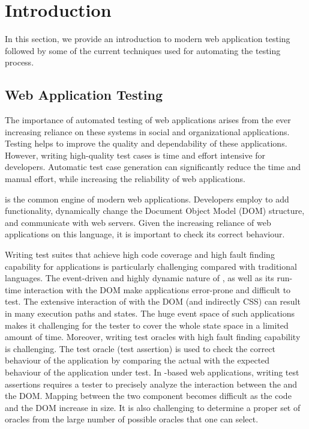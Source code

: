 \chapter{Introduction} \label{chap:intro}
In this section, we provide an introduction to modern web application testing followed by some of the current techniques used for automating the testing process.

\section{Web Application Testing} \label{Sec:web-testing}
The importance of automated testing of web applications arises from the ever increasing
reliance on these systems in social and organizational
applications. Testing helps to improve the quality and dependability of these applications. However, writing high-quality test cases is time and effort intensive for developers.
Automatic test case generation can significantly reduce the time and manual effort, while
increasing the reliability of web applications.

\javascript is the common engine of modern web applications. 
Developers employ \javascript to add functionality, dynamically change the Document Object Model (DOM) structure,
and communicate with web servers. Given the increasing reliance of web applications on this language, it is important to check its correct behaviour.

Writing test suites that achieve high code coverage and high fault finding capability for \javascript applications is particularly challenging compared with traditional languages.
The event-driven and highly dynamic nature of \javascript, as well as its run-time interaction with the DOM make \javascript applications error-prone \cite{Ocariza:esem2013} and difficult to test.
The extensive interaction of \javascript with the DOM (and indirectly CSS) can result in many execution paths and states. The huge event space of such applications makes it challenging for the tester to cover the whole state space in a limited amount of time. Moreover, writing test oracles with high fault finding capability is challenging. The test oracle (\ie test assertion) is used to check the correct behaviour of the application by comparing the actual with the expected behaviour of the application under test. In \javascript-based web applications, writing test assertions requires a tester to precisely analyze the interaction between the \javascript and the DOM. 
Mapping between the two component becomes difficult as the \javascript code and the DOM increase in size. It is also challenging to determine a proper set of oracles from the large number of possible oracles that one can select. 

